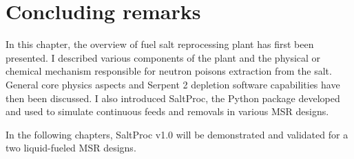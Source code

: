 \section{Concluding remarks}
In this chapter, the overview of fuel salt reprocessing plant has first been 
presented. I described various components of the plant and the physical or 
chemical mechanism responsible for neutron poisons extraction from the salt. 
General core physics aspects and Serpent 2 depletion software capabilities 
have then been discussed. I also introduced SaltProc, the Python package 
developed and used to simulate continuous feeds and removals in various 
\gls{MSR} designs.

In the following chapters, SaltProc v1.0 will be demonstrated and validated 
for a two liquid-fueled \gls{MSR} designs.